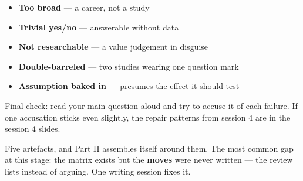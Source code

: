 \documentclass[11pt,a4paper,british,twoside=false,headings=small,chapterprefix=false,numbers=noenddot]{scrbook}
\begin{document}
\begin{center}\small
\small
  \begin{itemize}\setlength{\itemsep}{0.45em}
    \item \textbf{Too broad} --- a career, not a study
    \item \textbf{Trivial yes/no} --- answerable without data
    \item \textbf{Not researchable} --- a value judgement in disguise
    \item \textbf{Double-barreled} --- two studies wearing one question mark
    \item \textbf{Assumption baked in} --- presumes the effect it should test
  \end{itemize}
  
  Final check: read your main question aloud and try to accuse it of each
  failure. If one accusation sticks even slightly, the repair patterns from
  session 4 are in the session 4 slides.
\end{center}

\begin{center}\small
\begin{center}
  \end{center}
  
  Five artefacts, and Part II assembles itself around them. The most common
  gap at this stage: the matrix exists but the \textbf{moves} were never
  written --- the review lists instead of arguing. One writing session fixes
  it.
\end{center}
\end{document}
